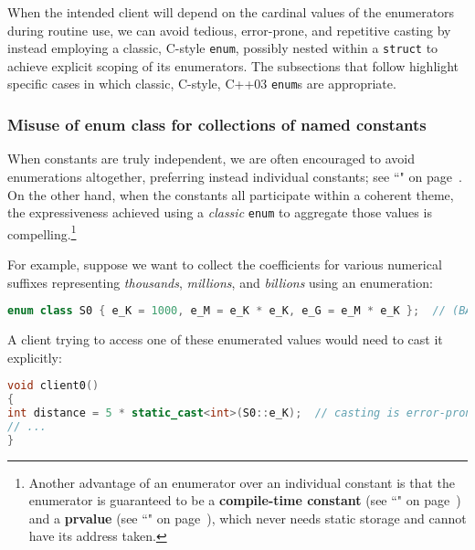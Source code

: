 \noindent When the intended client will depend on the cardinal values of the
enumerators during routine use, we can avoid tedious, error-prone, and
repetitive casting by instead employing a classic, C-style
\texttt{enum}, possibly nested within a \texttt{struct} to achieve
explicit scoping of its enumerators. The subsections that follow
highlight specific cases in which classic, C-style, C++03
\texttt{enum}s are appropriate.

\subsubsection[Misuse of {\tt enum} {\tt class} for collections of named constants]{Misuse of {\SubsubsecCode enum} {\SubsubsecCode class} for collections of named constants}\label{misuse-of-enum-class-for-collections-of-named-constants}

When constants are truly independent, we are often encouraged to avoid
enumerations altogether, preferring instead individual constants; see
``" on page~\pageref{Default-Member-Initializers}. On the other hand, when the constants all participate within a coherent
theme, the expressiveness achieved using a \emph{classic} \texttt{enum}
to aggregate those values is compelling.{\cprotect\footnote{Another
advantage of an enumerator over an individual constant is that the
enumerator is guaranteed to be a \textbf{compile-time constant} (see
``" on page~\pageref{constexprvar}) and a \textbf{prvalue} (see
``" on page~\pageref{Rvalue-References}), which never needs static storage
and cannot have its address taken.}}

For example, suppose we want to collect the coefficients for various
numerical suffixes representing \emph{thousands}, \emph{millions}, and
\emph{billions} using an enumeration:

\begin{lstlisting}[language=C++]
enum class S0 { e_K = 1000, e_M = e_K * e_K, e_G = e_M * e_K };  // (BAD IDEA)
\end{lstlisting}

\noindent A client trying to access one of these enumerated values would need to
cast it explicitly:

\begin{lstlisting}[language=C++]
void client0()
{
int distance = 5 * static_cast<int>(S0::e_K);  // casting is error-prone
// ...
}
\end{lstlisting}

